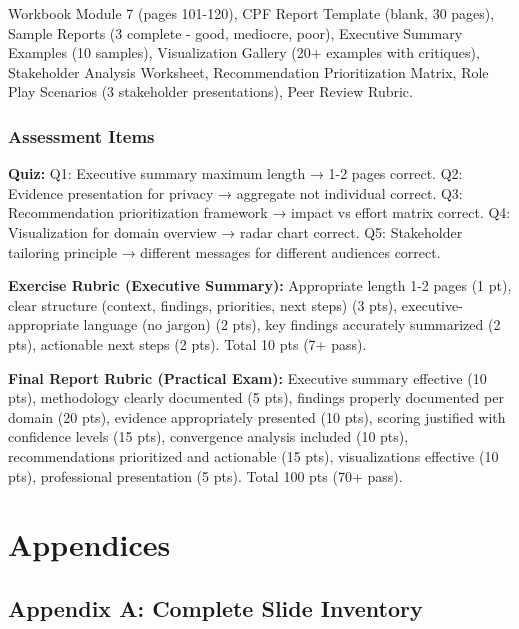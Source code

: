 \documentclass[11pt,a4paper]{article}
\begin{document}
Workbook Module 7 (pages 101-120), CPF Report Template (blank, 30 pages), Sample Reports (3 complete - good, mediocre, poor), Executive Summary Examples (10 samples), Visualization Gallery (20+ examples with critiques), Stakeholder Analysis Worksheet, Recommendation Prioritization Matrix, Role Play Scenarios (3 stakeholder presentations), Peer Review Rubric.

\subsubsection{Assessment Items}

\textbf{Quiz:} Q1: Executive summary maximum length → 1-2 pages correct. Q2: Evidence presentation for privacy → aggregate not individual correct. Q3: Recommendation prioritization framework → impact vs effort matrix correct. Q4: Visualization for domain overview → radar chart correct. Q5: Stakeholder tailoring principle → different messages for different audiences correct.

\textbf{Exercise Rubric (Executive Summary):} Appropriate length 1-2 pages (1 pt), clear structure (context, findings, priorities, next steps) (3 pts), executive-appropriate language (no jargon) (2 pts), key findings accurately summarized (2 pts), actionable next steps (2 pts). Total 10 pts (7+ pass).

\textbf{Final Report Rubric (Practical Exam):} Executive summary effective (10 pts), methodology clearly documented (5 pts), findings properly documented per domain (20 pts), evidence appropriately presented (10 pts), scoring justified with confidence levels (15 pts), convergence analysis included (10 pts), recommendations prioritized and actionable (15 pts), visualizations effective (10 pts), professional presentation (5 pts). Total 100 pts (70+ pass).

\newpage

\section{Appendices}

\subsection{Appendix A: Complete Slide Inventory}
\end{document}

